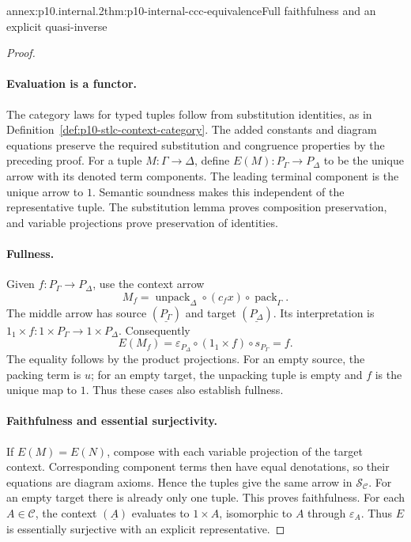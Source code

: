 \begin{annexitem}{annex:p10.internal.2}{thm:p10-internal-ccc-equivalence}{Full faithfulness and an explicit quasi-inverse}
\begin{proof}
\paragraph{Evaluation is a functor.}
The category laws for typed tuples follow from substitution identities,
as in Definition~\ref{def:p10-stlc-context-category}.
The added constants and diagram equations preserve the required
substitution and congruence properties by the preceding proof.
For a tuple \(M:\Gamma\to\Delta\), define \(E(M):P_\Gamma\to P_\Delta\)
to be the unique arrow with its denoted term components.
The leading terminal component is the unique arrow to \(1\).
Semantic soundness makes this independent of the representative tuple.
The substitution lemma proves composition preservation, and variable
projections prove preservation of identities.

\paragraph{Fullness.}
Given \(f:P_\Gamma\to P_\Delta\), use the context arrow
\[
 M_f=\operatorname{unpack}_\Delta\circ(c_fx)
                         \circ\operatorname{pack}_\Gamma.
\]
The middle arrow has source \((\underline{P_\Gamma})\) and target
\((\underline{P_\Delta})\).  Its interpretation is
\(1_1\times f:1\times P_\Gamma\to1\times P_\Delta\).
Consequently
\[
 E(M_f)=\varepsilon_{P_\Delta}\circ(1_1\times f)\circ s_{P_\Gamma}=f.
\]
The equality follows by the product projections.
For an empty source, the packing term is \(u\); for an empty target,
the unpacking tuple is empty and \(f\) is the unique map to \(1\).
Thus these cases also establish fullness.

\paragraph{Faithfulness and essential surjectivity.}
If \(E(M)=E(N)\), compose with each variable projection of the target
context.  Corresponding component terms then have equal denotations,
so their equations are diagram axioms.  Hence the tuples give the
same arrow in \(\mathcal S_{\mathcal C}\).
For an empty target there is already only one tuple.
This proves faithfulness.
For each \(A\in\mathcal C\), the context \((\underline A)\) evaluates
to \(1\times A\), isomorphic to \(A\) through \(\varepsilon_A\).
Thus \(E\) is essentially surjective with an explicit representative.


\end{proof}
\end{annexitem}
